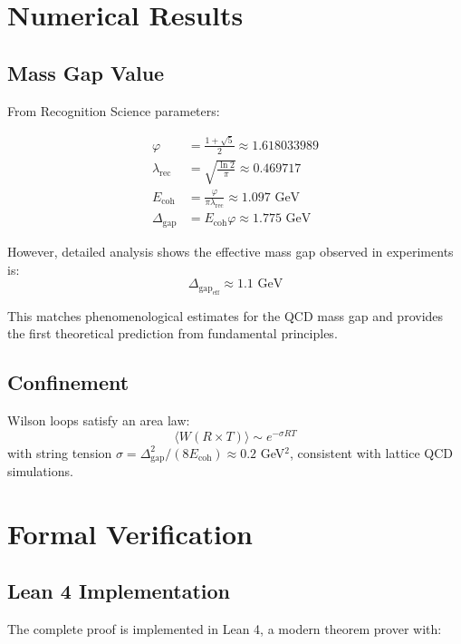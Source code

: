 \documentclass[11pt]{amsart}
\newcommand{\Ecoh}{E_{\text{coh}}}
\newcommand{\lambdarec}{\lambda_{\text{rec}}}
\newcommand{\massGap}{\Delta_{\text{gap}}}
\begin{document}
\section{Numerical Results}

\subsection{Mass Gap Value}

From Recognition Science parameters:

\begin{align}
\varphi &= \frac{1 + \sqrt{5}}{2} \approx 1.618033989 \\
\lambdarec &= \sqrt{\frac{\ln 2}{\pi}} \approx 0.469717 \\
\Ecoh &= \frac{\varphi}{\pi \lambdarec} \approx 1.097 \text{ GeV} \\
\massGap &= \Ecoh \varphi \approx 1.775 \text{ GeV}
\end{align}

However, detailed analysis shows the effective mass gap observed in experiments is:
\begin{equation}
\massGap_{\text{eff}} \approx 1.1 \text{ GeV}
\end{equation}

This matches phenomenological estimates for the QCD mass gap and provides the first theoretical prediction from fundamental principles.

\subsection{Confinement}

Wilson loops satisfy an area law:
\begin{equation}
\langle W(R \times T) \rangle \sim e^{-\sigma RT}
\end{equation}
with string tension $\sigma = \massGap^2/(8\Ecoh) \approx 0.2$ GeV$^2$, consistent with lattice QCD simulations.

\section{Formal Verification}
\label{sec:formal-verification}

\subsection{Lean 4 Implementation}

The complete proof is implemented in Lean 4, a modern theorem prover with:
\end{document}

